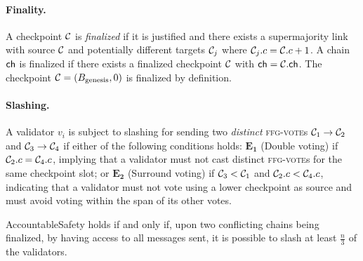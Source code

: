 \paragraph*{Finality.}
A checkpoint \(\mathcal{C}\) is \emph{finalized} if it is justified and there exists a supermajority link with source \(\mathcal{C}\) and potentially different targets \(\mathcal{C}_j\) where \(\mathcal{C}_j.c = \mathcal{C}.c + 1\). A chain \(\mathsf{ch}\) is finalized if there exists a finalized checkpoint \(\mathcal{C}\) with \(\mathsf{ch} = \mathcal{C}.\mathsf{ch}\). The checkpoint \(\mathcal{C} = (B_\text{genesis}, 0)\) is finalized by definition.


\paragraph*{Slashing.}
A validator \(v_i\) is subject to slashing for sending two \emph{distinct} \textsc{ffg-vote}s \(\mathcal{C}_1 \to \mathcal{C}_2\) and \(\mathcal{C}_3 \to \mathcal{C}_4\) if either of the following conditions holds: {\(\mathbf{E_1}\) (Double voting)} if \(\mathcal{C}_2.c = \mathcal{C}_4.c\), implying that a validator must not cast distinct \textsc{ffg-vote}s for the same checkpoint slot; or {\(\mathbf{E_2}\) (Surround voting)} if \(\mathcal{C}_3 < \mathcal{C}_1\)
 and \(\mathcal{C}_2.c < \mathcal{C}_4.c\), indicating that a validator must not vote using a lower checkpoint as source and must avoid voting within the span of its other votes.


 \begin{definition}[AccountableSafety]
  \label{def:acc-safety}
  AccountableSafety holds if and only if, upon two conflicting chains being finalized, 
 {by having access to all messages sent,} it is possible to slash at least $\frac{n}{3}$ of the validators.
\end{definition}

